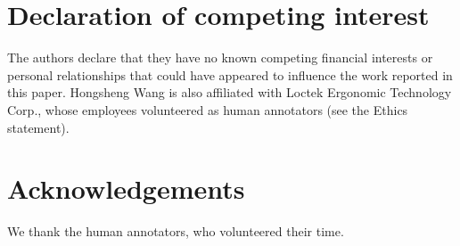 \documentclass[preprint,12pt]{elsarticle}
\begin{document}
\section*{Declaration of competing interest}
The authors declare that they have no known competing financial interests or personal relationships that could have appeared to influence the work reported in this paper. Hongsheng Wang is also affiliated with Loctek Ergonomic Technology Corp., whose employees volunteered as human annotators (see the Ethics statement).

\section*{Acknowledgements}
We thank the human annotators, who volunteered their time.





\end{document}
